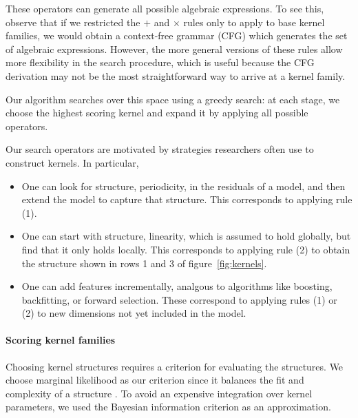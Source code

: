 \documentclass[twoside]{article}
\renewcommand{\fTBD}[1]{}
\begin{document}
These operators can generate all possible algebraic expressions.
To see this, observe that if we restricted the $+$ and $\times$ rules only to apply to base kernel families, we would obtain a context-free grammar (CFG) which generates the set of algebraic expressions.
However, the more general versions of these rules allow more flexibility in the search procedure, which is useful because the CFG derivation may not be the most straightforward way to arrive at a kernel family.

Our algorithm searches over this space using a greedy search: at each stage, we choose the highest scoring kernel and expand it by applying all possible operators.

Our search operators are motivated by strategies researchers often use to construct kernels.
In particular,
\begin{itemize}
\item One can look for structure, \eg periodicity, in the residuals of a model, and then extend the model to capture that structure.
This corresponds to applying rule (1).
\item One can start with structure, \eg linearity, which is assumed to hold globally, but find that it only holds locally.
This corresponds to applying rule (2) to obtain the structure shown in rows 1 and 3 of figure~\ref{fig:kernels}.
\item One can add features incrementally, analgous to algorithms like boosting, backfitting, or forward selection.
These correspond to applying rules (1) or (2) to new dimensions not yet included in the model.
\end{itemize}

\paragraph{Scoring kernel families}

Choosing kernel structures requires a criterion for evaluating the structures.
We choose marginal likelihood as our criterion since it balances the fit and complexity of a structure \citep[e.g.][]{rasmussen2001occam}.
To avoid an expensive integration over kernel parameters, we used the Bayesian information criterion \citep{schwarz1978estimating} as an approximation.
\end{document}
